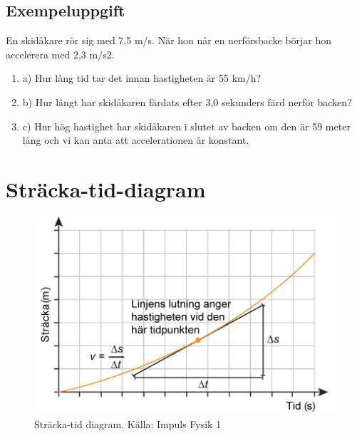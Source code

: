 \documentclass[11pt]{article}
\begin{document}
    \subsection{Exempeluppgift}
    En skidåkare rör sig med 7,5 m/s. När hon når en
    nerförsbacke börjar hon accelerera med 2,3 m/s2.
    \begin{enumerate}
        \item{a)} Hur lång tid tar det innan hastigheten är 55 km/h?
        \item{b)} Hur långt har skidåkaren färdats efter 3,0
        sekunders färd nerför backen?
        \item{c)} Hur hög hastighet har skidåkaren i slutet av
        backen om den är 59 meter lång och vi kan anta att
        accelerationen är konstant.
    \end{enumerate}
    \section{Sträcka-tid-diagram}
\begin{figure}[!h]
\includegraphics[width=\textwidth]{../images/chapter3/DistTime.png}
\caption{Sträcka-tid diagram. Källa: Impuls Fysik 1}
\end{figure}
\clearpage
\end{document}
